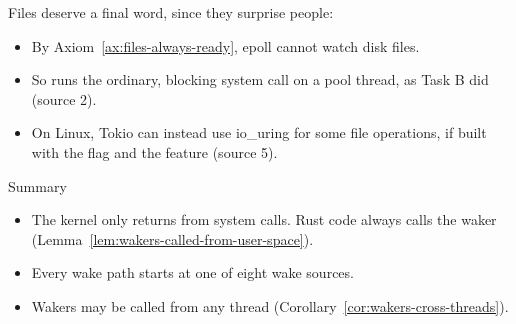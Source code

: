 Files deserve a final word, since they surprise people:

\begin{itemize}
    \item By Axiom~\ref{ax:files-always-ready}, epoll cannot watch disk files.
    \item So  runs the ordinary, blocking system call on a pool thread, as Task B did (source 2).
    \item On Linux, Tokio can instead use io\_uring for some file operations, if built with the  flag and the  feature (source 5).
\end{itemize}

\begin{quotebox}{Summary}
    \begin{itemize}
        \item The kernel only returns from system calls. Rust code always calls the waker (Lemma~\ref{lem:wakers-called-from-user-space}).
        \item Every wake path starts at one of eight wake sources.
        \item Wakers may be called from any thread (Corollary~\ref{cor:wakers-cross-threads}).
    \end{itemize}
\end{quotebox}

